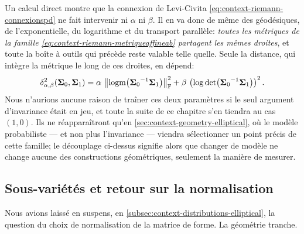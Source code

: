 \begin{remark}
\label{rem:context-riemann-alphabeta}
  Un calcul direct montre que la connexion de Levi-Civita \cref{eq:context-riemann-connexionspd} ne fait intervenir ni $\alpha$ ni $\beta$. Il en va donc de même des géodésiques, de l'exponentielle, du logarithme et du transport parallèle: \emph{toutes les métriques de la famille \cref{eq:context-riemann-metriqueaffineab} partagent les mêmes droites}, et toute la boîte à outils qui précède reste valable telle quelle. Seule la distance, qui intègre la métrique le long de ces droites, en dépend:
  \begin{equation}
    \delta_{\alpha,\beta}^2(\boldsymbol{\Sigma}_0,\boldsymbol{\Sigma}_1)
    =
    \alpha\,\left\lVert\operatorname{\operatorname{logm}}\!\left({\boldsymbol{\Sigma}_0}^{-1}\boldsymbol{\Sigma}_1\right)\right\rVert_{\mathbb{F}}^2
    +
    \beta\,\left(\log\operatorname{\operatorname{det}}\!\left({\boldsymbol{\Sigma}_0}^{-1}\boldsymbol{\Sigma}_1\right)\right)^2.
    \label{eq:context-riemann-distspdab}
  \end{equation}
  Nous n'aurions aucune raison de traîner ces deux paramètres si le seul argument d'invariance était en jeu, et toute la suite de ce chapitre s'en tiendra au cas $(1,0)$. Ils ne réapparaîtront qu'en \cref{sec:context-geometry-elliptical}, où le modèle probabiliste --- et non plus l'invariance --- viendra sélectionner un point précis de cette famille; le découplage ci-dessus signifie alors que changer de modèle ne change aucune des constructions géométriques, seulement la manière de mesurer.
\end{remark}

\subsection{Sous-variétés et retour sur la normalisation}

Nous avions laissé en suspens, en \cref{subsec:context-distributions-elliptical}, la question du choix de normalisation de la matrice de forme. La géométrie tranche.

